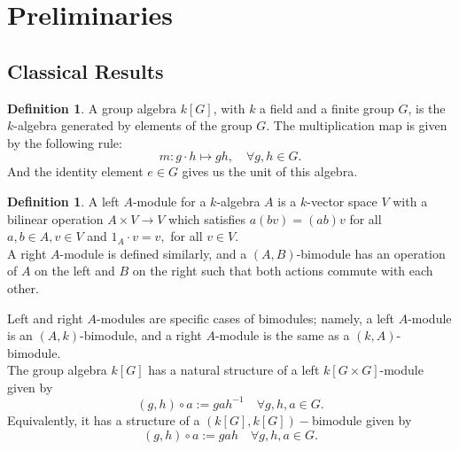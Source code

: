 \documentclass[12pt,reqno]{amsart}
\theoremstyle{definition}
\newtheorem{defn}[thm]{Definition}
\theoremstyle{remark}
\numberwithin{equation}{section}
\begin{document}

\section{Preliminaries}
\subsection{Classical Results}

\begin{defn}
    A group algebra $k[G]$, with $k$ a field and a finite group $G$, is the $k$-algebra generated by elements of the group $G$. The multiplication map is given by the following rule:
    \begin{equation*}
        m:g\cdot h \mapsto gh, \quad \forall g,h\in G.
    \end{equation*}
    And the identity element $e\in G$ gives us the unit of this algebra.
\end{defn} 

\begin{defn}
    A left $A$-module for a $k$-algebra $A$ is a $k$-vector space $V$ with a bilinear operation $A \times V \to V$ which satisfies $a(bv) = (ab)v$ for all $a, b \in A,v \in V$ and $1_A\cdot v=v,$ for all $v\in V$.\\
    
    A right $A$-module is defined similarly, and a $(A, B)$-bimodule has an operation of $A$ on the left and $B$ on the right such that both actions commute with each other.
\end{defn}

Left and right $A$-modules are specific cases of bimodules; namely, a left $A$-module is an $(A, k)$-bimodule, and a right $A$-module is the same as a $(k, A)$-bimodule.\\

The group algebra $k[G]$ has a natural structure of a left $k[G \times G]$-module given by
\begin{equation*}
    (g,h)\circ a := gah^{-1} \quad \forall g,h,a \in G.
\end{equation*}
Equivalently, it has a structure of a $(k[G],k[G])-$bimodule given by
\[
    (g,h)\circ a := gah \quad \forall g,h,a \in G.
\]
\end{document}
